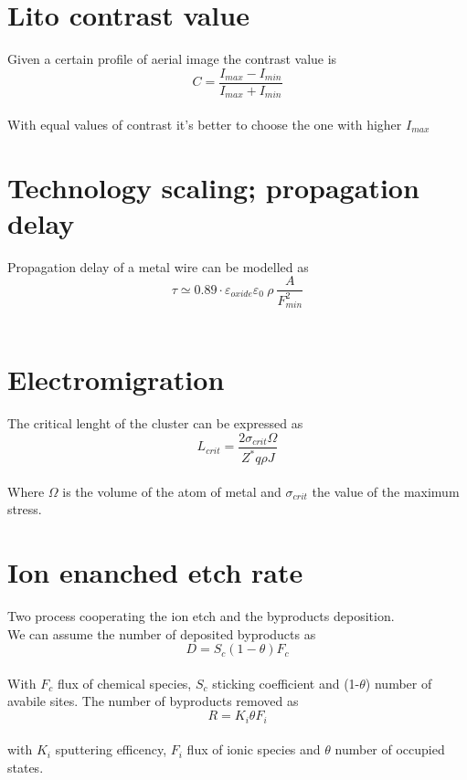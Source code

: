 
\section{Lito contrast value}
Given a certain profile of aerial image the contrast value is 
\begin{equation}
C=\frac{I_{max}-I_{min}}{I_{max}+I_{min}}
\end{equation}
\\
With equal values of contrast it's better to choose the one with higher $I_{max}$





\section{Technology scaling; propagation delay}
Propagation delay of a metal wire can be modelled as
\begin{equation}
\tau\simeq 0.89 \cdot \varepsilon_{oxide}\varepsilon_0 \ \rho \  \frac{A}{F_{min}^2} 
\end{equation}
\\


\section{Electromigration}
The critical lenght of the cluster can be expressed as 
\begin{equation}
L_{crit}=\frac{2\sigma_{crit}\Omega}{Z^*q\rho J}
\end{equation}
\\
Where $\Omega$ is the volume of the atom of metal and $\sigma_{crit}$ the value of the maximum stress.\\


\section{Ion enanched etch rate}

Two process cooperating the ion etch and the byproducts deposition.\\
We can assume the number of deposited byproducts as
\begin{equation}
D=S_c(1-\theta)F_c
\end{equation}
\\
With $F_c$ flux of chemical species, $S_c$ sticking coefficient and (1-$\theta$) number of avabile sites.
The number of byproducts removed as
\begin{equation}
R=K_i\theta F_i
\end{equation}
\\
with $K_i$ sputtering efficency, $F_i$ flux of ionic species and $\theta$ number of occupied states.\\

